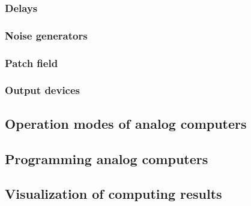 \documentclass[letterpaper,10pt,english]{sphinxmanual}
\begin{document}
\subsection{Delays}
\label{\detokenize{rst/computing_elements/delays:delays}}\label{\detokenize{rst/computing_elements/delays::doc}}

\subsection{Noise generators}
\label{\detokenize{rst/computing_elements/noise_generators:noise-generators}}\label{\detokenize{rst/computing_elements/noise_generators::doc}}

\subsection{Patch field}
\label{\detokenize{rst/computing_elements/patch_field:patch-field}}\label{\detokenize{rst/computing_elements/patch_field::doc}}

\subsection{Output devices}
\label{\detokenize{rst/computing_elements/output_devices:output-devices}}\label{\detokenize{rst/computing_elements/output_devices::doc}}

\section{Operation modes of analog computers}
\label{\detokenize{rst/basics_operation_modes:operation-modes-of-analog-computers}}\label{\detokenize{rst/basics_operation_modes::doc}}

\section{Programming analog computers}
\label{\detokenize{rst/basics_programming:programming-analog-computers}}\label{\detokenize{rst/basics_programming::doc}}

\section{Visualization of computing results}
\label{\detokenize{rst/basics_visualization:visualization-of-computing-results}}\label{\detokenize{rst/basics_visualization::doc}}

\chapter{}
\label{\detokenize{index:applications}}
\end{document}
